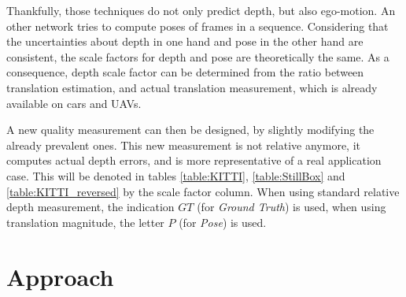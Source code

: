 \documentclass[runningheads]{llncs}
\begin{document}
Thankfully, those techniques
do
not only predict depth, but also ego-motion. An other network tries to compute poses of frames in a sequence. Considering that the
uncertainties
about depth in one hand and pose in the other hand are consistent, the scale factors for depth and pose are theoretically the same.
As a consequence, depth scale factor can be determined from the ratio between translation estimation, and actual translation measurement, which is already available on cars and UAVs.

A new quality measurement can then be designed, by slightly modifying the already prevalent ones. This new measurement is not relative anymore, it computes actual depth errors, and is more representative of a real application case. This will be denoted in tables \ref{table:KITTI}, \ref{table:StillBox} and \ref{table:KITTI_reversed} by the scale factor column. When using standard relative depth measurement, the indication $GT$ (for \emph{Ground Truth}) is used, when using translation magnitude, the letter $P$ (for \emph{Pose}) is used.

\section{Approach}
\end{document}
